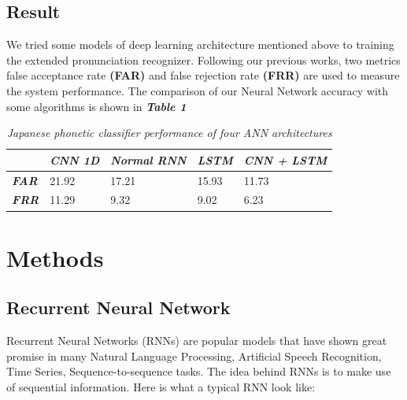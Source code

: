 \documentclass[conference]{IEEEtran}
\begin{document}
\subsection{Result}

We tried some models of deep learning architecture mentioned above to training the extended pronunciation recognizer. Following our previous works, two metrics false acceptance rate \textbf{(FAR)} and false rejection rate \textbf{(FRR)} are used to measure the system performance. The comparison of our Neural Network accuracy with some algorithms is shown in \textit{\textbf{Table 1}}

\begin{table}[]
\centering
\caption{\textit{Japanese phonetic classifier performance of four ANN architectures}}
\label{my-label}
\begin{tabular}{|l|l|l|l|l|}
\hline
                                                           & {\color[HTML]{333333} \textit{\textbf{CNN 1D}}} & {\color[HTML]{333333} \textit{\textbf{Normal RNN}}} & {\color[HTML]{333333} \textit{\textbf{LSTM}}} & {\color[HTML]{333333} \textit{\textbf{CNN + LSTM}}} 
                                                           \\ \hline
{\color[HTML]{333333} \textit{\textbf{FAR}}} & 21.92                                       & 17.21 & 
15.93 & 
11.73                                                  \\ \hline
{\color[HTML]{333333} \textit{\textbf{FRR}}} & 11.29                                       & 9.32 & 
9.02                                       & 6.23                                               \\ \hline
\end{tabular}
\end{table}

\section{Methods}

\subsection{Recurrent Neural Network}
Recurrent Neural Networks (RNNs) are popular models that have shown great promise in many Natural Language Processing, Artificial Speech Recognition, Time Series, Sequence-to-sequence tasks. The idea behind RNNs is to make use of sequential information. Here is what a typical RNN look like:
\end{document}
